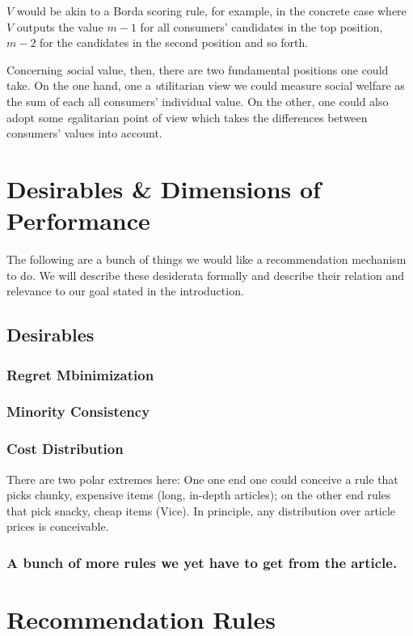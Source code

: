 \documentclass{article}
\begin{document}
$V$ would be akin to a Borda scoring rule, for example, in the concrete case
 where $V$ outputs the value $m-1$ for all consumers' candidates in the top position, $m-2$ for the candidates in the second position and so forth.

Concerning {\emph social value}, then, there are two fundamental positions one could take. On the one hand, one a {\emph utilitarian} view we could measure social welfare as the sum of each all consumers' individual value. On the other, one could also adopt some {\emph egalitarian} point of view which takes the differences between consumers' values into account.


\section{Desirables \& Dimensions of Performance}\label{desirables}
The following are a bunch of things we would like a recommendation mechanism to do.
We will describe these desiderata formally and describe their relation and relevance to our goal stated in the introduction.
\subsection{Desirables}
\subsubsection{Regret Mbinimization}
\subsubsection{Minority Consistency}
\subsubsection{Cost Distribution}
There are two polar extremes here:
One one end one could conceive a rule that picks chunky, expensive items (long, in-depth articles);
 on the other end rules that pick snacky, cheap items (Vice).
 In principle, any distribution over article prices is conceivable.
 \subsubsection{A bunch of more rules we yet have to get from the article.} 


\section{Recommendation Rules}
\end{document}
